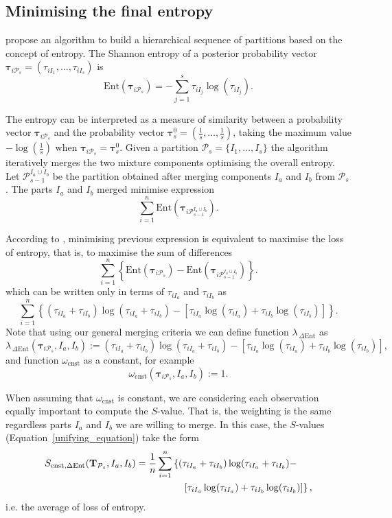 \documentclass[submit]{smj}
\theoremstyle{definition}
\newcommand{\m}[1]{\boldsymbol{#1}}
\begin{document}
\subsection{Minimising the final entropy}
\label{entropy_section}

\cite{baudry2010combining} propose an algorithm to build a hierarchical sequence of partitions based on the concept of entropy. The Shannon entropy of a posterior probability vector $\m\tau_{i \mathcal{P}_s} = \left( \tau_{i I_1} , \dots, \tau_{i I_s}  \right)$ is
\[
\text{Ent}( \m\tau_{i \mathcal{P}_s} ) = -\sum_{j=1}^s \tau_{i I_j}  \log(\tau_{i I_j} ).
\]

The entropy can be interpreted as a measure of similarity between a probability vector $\m\tau_{i \mathcal{P}_s}$ and the probability vector $\m\tau^0_{s}=\left(\frac{1}{s}, \dots, \frac{1}{s}\right)$, taking the maximum value $-\log(\frac{1}{s})$ when $\m\tau_{i \mathcal{P}_s}=\m\tau^0_{s}$. Given a partition $\mathcal{P}_s = \{ I_1, \dots, I_s\}$ the algorithm iteratively merges  the two mixture components optimising the overall entropy. Let $\mathcal{P}_{s-1}^{I_a\cup I_b}$ be the partition obtained after merging components $I_a$ and $I_b$ from $\mathcal{P}_s$. The parts $I_a$ and $I_b$ merged minimise expression
\[
\sum_{i=1}^n \text{Ent}( \m\tau_{i \mathcal{P}_{s-1}^{I_a\cup I_b}} ).
\]

According to \cite{baudry2010combining}, minimising previous expression is equivalent to maximise the loss of entropy, that is, to maximise the sum of differences
\[
\sum_{i=1}^n  \left\{ \text{Ent}( \m\tau_{i \mathcal{P}_s} ) - \text{Ent}( \m\tau_{i \mathcal{P}_{s-1}^{I_a\cup I_b}} ) \right\}.
\]
which can be written only in terms of $\tau_{i I_a}$  and $\tau_{i I_b}$ as
\begin{equation}\label{entropy}
\sum_{i=1}^n   \left\{(\tau_{iI_a}+\tau_{iI_b}) \log(\tau_{iI_a} + \tau_{iI_b}) - \left[\tau_{iI_a} \log(\tau_{iI_a}) + \tau_{iI_b} \log(\tau_{iI_b})\right] \right\}.
\end{equation}
Note that using our general merging criteria we can define function $\lambda_{\,\Delta\text{Ent}}$ as
\[
\lambda_{\,\Delta\text{Ent}}(\m\tau_{i \mathcal{P}_s},  I_a,  I_b) :=  (\tau_{iI_a}+\tau_{iI_b}) \log(\tau_{iI_a} + \tau_{iI_b}) - \left[ \tau_{iI_a} \log(\tau_{iI_a}) + \tau_{iI_b} \log(\tau_{iI_b}) \right],
\]
and function $\omega_{\text{cnst}}$ as a constant, for example 
\[
\omega_{\text{cnst}}(\m\tau_{i \mathcal{P}_s},  I_a,  I_b) := 1.
\]

When assuming that $\omega_{\text{cnst}}$ is constant, we are considering each observation equally important to compute the $S$-value. That is, the weighting is the same regardless parts $I_a$ and $I_b$ we are willing to merge. In this case, the $S$-values (Equation~\ref{unifying_equation}) take the form
\[
\begin{split}
S_{\text{cnst}, \Delta\text{Ent}}( \text{\textbf{T}}_{\mathcal{P}_s},  I_a,  I_b) = \frac{1}{n} \sum_{i=1}^n & \left\{(\tau_{iI_a}+\tau_{iI_b}) \log(\tau_{iI_a} + \tau_{iI_b}) - \right.\\ 
&\quad \left.\left[ \tau_{iI_a} \log(\tau_{iI_a}) + \tau_{iI_b} \log(\tau_{iI_b}) \right]\right\},
\end{split}
\]
i.e. the average of loss of entropy.
\end{document}
